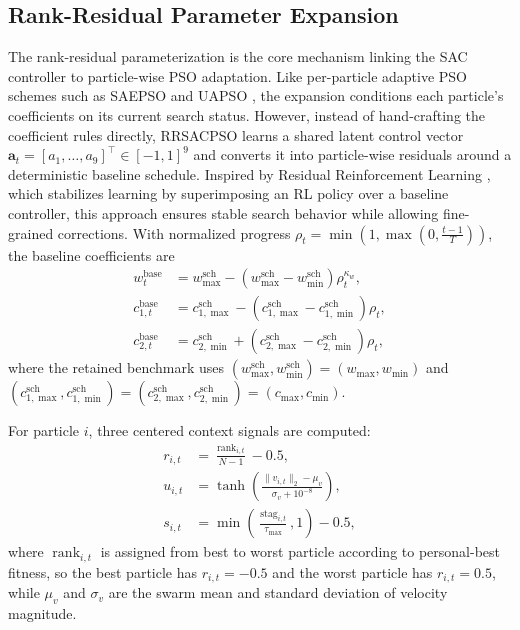 \documentclass[final,5p,times]{elsarticle}
\newcommand{\symExpInertia}{\kappa_w}
\newcommand{\symWmaxSch}{w_{\max}}
\newcommand{\symWminSch}{w_{\min}}
\newcommand{\symCmaxSch}{c_{\max}}
\newcommand{\symCminSch}{c_{\min}}
\newcommand{\symStagMaxPart}{\tau_{\text{max}}}
\begin{document}
\subsection{Rank-Residual Parameter Expansion}
The rank-residual parameterization is the core mechanism linking the SAC controller to particle-wise PSO adaptation.
Like per-particle adaptive PSO schemes such as SAEPSO and UAPSO \cite{Liu2025A, Isiet2019Selfadapting}, the expansion conditions each particle's coefficients on its current search status.
However, instead of hand-crafting the coefficient rules directly, RRSACPSO learns a shared latent control vector $\mathbf{a}_t = [a_1,\dots,a_9]^\top \in [-1,1]^9$ and converts it into particle-wise residuals around a deterministic baseline schedule. Inspired by Residual Reinforcement Learning \cite{Johannink2019Residual}, which stabilizes learning by superimposing an RL policy over a baseline controller, this approach ensures stable search behavior while allowing fine-grained corrections.
With normalized progress $\rho_t = \min\!\left(1,\max\!\left(0,\frac{t-1}{T}\right)\right)$, the baseline coefficients are
\begin{equation}
\begin{aligned}
w_t^{\mathrm{base}} &= w_{\max}^{\mathrm{sch}} - \left(w_{\max}^{\mathrm{sch}} - w_{\min}^{\mathrm{sch}}\right)\rho_t^{\symExpInertia}, \\
c_{1,t}^{\mathrm{base}} &= c_{1,\max}^{\mathrm{sch}} - \left(c_{1,\max}^{\mathrm{sch}} - c_{1,\min}^{\mathrm{sch}}\right)\rho_t, \\
c_{2,t}^{\mathrm{base}} &= c_{2,\min}^{\mathrm{sch}} + \left(c_{2,\max}^{\mathrm{sch}} - c_{2,\min}^{\mathrm{sch}}\right)\rho_t,
\end{aligned}
\label{eq:rank_residual_base}
\end{equation}
where the retained benchmark uses $(w_{\max}^{\mathrm{sch}}, w_{\min}^{\mathrm{sch}}) = (\symWmaxSch, \symWminSch)$ and $(c_{1,\max}^{\mathrm{sch}}, c_{1,\min}^{\mathrm{sch}}) = (c_{2,\max}^{\mathrm{sch}}, c_{2,\min}^{\mathrm{sch}}) = (\symCmaxSch, \symCminSch)$.

For particle $i$, three centered context signals are computed:
\begin{equation}
\begin{aligned}
r_{i,t} &= \frac{\operatorname{rank}_{i,t}}{N-1} - 0.5, \\
u_{i,t} &= \tanh\!\left(\frac{\|v_{i,t}\|_2 - \mu_v}{\sigma_v + 10^{-8}}\right), \\
s_{i,t} &= \min\!\left(\frac{\operatorname{stag}_{i,t}}{\symStagMaxPart}, 1\right) - 0.5,
\end{aligned}
\label{eq:rank_residual_context}
\end{equation}
where $\operatorname{rank}_{i,t}$ is assigned from best to worst particle according to personal-best fitness, so the best particle has $r_{i,t}=-0.5$ and the worst particle has $r_{i,t}=0.5$, while $\mu_v$ and $\sigma_v$ are the swarm mean and standard deviation of velocity magnitude.
\end{document}
